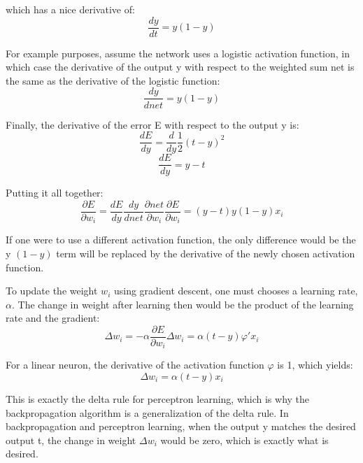 \documentclass[a4paper,12pt]{article}
\begin{document}
which has a nice derivative of:
\begin{equation}
     \frac {dy}{dt} = y(1-y) 
\end{equation}

For example purposes, assume the network uses a logistic activation function, in which case the derivative of the output y with respect to the weighted sum net is the same as the derivative of the logistic function:
\begin{equation}
     \frac {dy}{dnet} = y(1-y) 
\end{equation}

Finally, the derivative of the error E with respect to the output y is:
\begin{equation}
 	\frac{dE}{dy} = \frac {d}{dy} \frac{1}{2}(t - y)^2
\end{equation}
\begin{equation}
	\frac{dE}{dy} = y - t
\end{equation}

Putting it all together:
\begin{equation}
 	\frac{\partial E}{\partial w_i} = \frac{dE}{dy} \frac{dy}{dnet} \frac{\partial net}{\partial w_i}
	\frac{\partial E}{\partial w_i} = (y - t) y (1 - y) x_i
\end{equation}

If one were to use a different activation function, the only difference would be the y $(1 - y)$ term will be replaced by the derivative of the newly chosen activation function.

To update the weight $w_i$ using gradient descent, one must chooses a learning rate, $\alpha$. The change in weight after learning then would be the product of the learning rate and the gradient:
\begin{equation}
 	\Delta w_i = - \alpha \frac{\partial E}{\partial w_i}
	\Delta w_i = \alpha (t - y) \varphi' x_i
\end{equation}

For a linear neuron, the derivative of the activation function $\varphi$ is 1, which yields:
\begin{equation}
     \Delta w_i = \alpha (t - y) x_i 
\end{equation}

This is exactly the delta rule for perceptron learning, which is why the backpropagation algorithm is a generalization of the delta rule. In backpropagation and perceptron learning, when the output y matches the desired output t, the change in weight $\Delta w_i$ would be zero, which is exactly what is desired.
\end{document}
